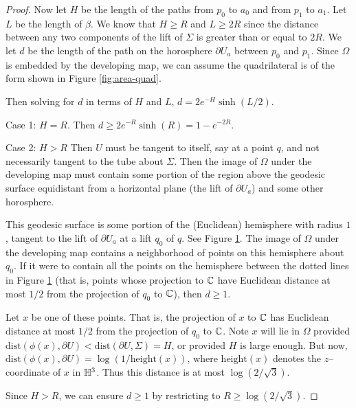 \begin{proof}
Now let $H$ be the length of the paths from $p_0$ to $a_0$ and from
$p_1$ to $a_1$.  Let $L$ be the length of $\beta$.  We know that
$H\geq R$ and $L\geq 2R$ since the distance between any two components
of the lift of $\Sigma$ is greater than or equal to $2R$.  We let $d$
be the length of the path on the horosphere $\partial U_a$ between
$p_0$ and $p_1$.  Since $\Omega$ is embedded by the developing map, we
can assume the quadrilateral is of the form shown in Figure
\ref{fig:area-quad}.

Then solving for $d$ in terms of $H$ and $L$, $d= 2e^{-H}\sinh(L/2)$.

Case 1:  $H=R$.  Then $d \geq 2e^{-R}\sinh(R) = 1-e^{-2R}$.

Case 2: $H>R$ Then $U$ must be tangent to itself, say at a point $q$,
and not necessarily tangent to the tube about $\Sigma$.  Then the
image of $\Omega$ under the developing map must contain some portion
of the region above the geodesic surface equidistant from a horizontal
plane (the lift of $\partial U_a$) and some other horosphere.

This geodesic surface is some portion of the (Euclidean) hemisphere
with radius $1$, tangent to the lift of $\partial U_a$ at a lift $q_0$
of $q$.  See Figure \ref{fig:d-long}.  The image of $\Omega$ under the
developing map contains a neighborhood of points on this hemisphere
about $q_0$.  If it were to contain all the points on the hemisphere
between the dotted lines in Figure \ref{fig:d-long} (that is, points
whose projection to ${\mathbb{C}}$ have Euclidean distance at most $1/2$ from
the projection of $q_0$ to ${\mathbb{C}}$), then $d\geq 1$.

Let $x$ be one of these points.  That is, the projection of $x$ to
${\mathbb{C}}$ has Euclidean distance at most $1/2$ from the projection of
$q_0$ to ${\mathbb{C}}$.  Note $x$ will lie in $\Omega$ provided
$\mbox{dist}(\phi(x), \partial U) < \mbox{dist}(\partial U, \Sigma) =
H$, or provided $H$ is large enough.  But now, $\mbox{dist}(\phi(x),
\partial U) = \log( 1/\mbox{height}(x))$, where $\mbox{height}(x)$
denotes the $z$--coordinate of $x$ in ${\mathbb{H}}^3$.  Thus this distance is
at most $\log(2/\sqrt{3})$.

\begin{figure}
	
\caption{}
\label{fig:d-long}
\end{figure}

Since $H>R$, we can ensure $d\geq 1$ by restricting to $R\geq
\log(2/\sqrt{3})$.
\end{proof}

